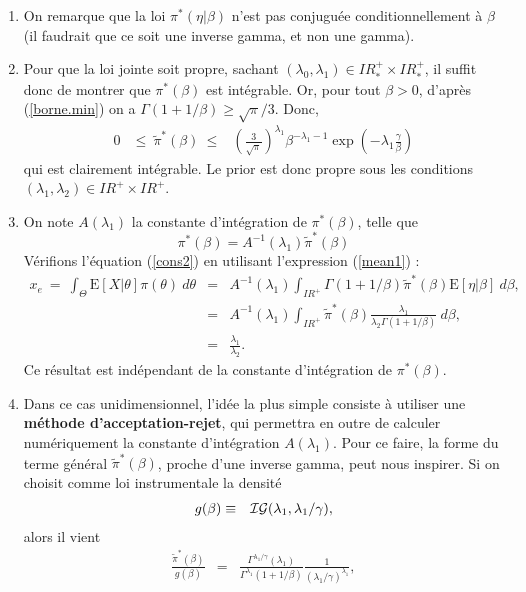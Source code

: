 \documentclass[10pt]{article}
\newcommand{\R}{I\!\!R}
\newcommand{\E}{\mbox{E}}
\newcommand{\1}{\mathbbm{1}}
\begin{document}
\begin{enumerate}
\item On remarque que la loi $\pi^*(\eta|\beta)$ n'est pas conjuguée conditionnellement à $\beta$ (il faudrait que ce soit une inverse gamma, et non une gamma). 
\item Pour que la loi jointe soit propre, sachant $(\lambda_0,\lambda_1)\in\R^+_*\times \R^+_*$, il suffit donc de montrer que $\pi^*(\beta)$ est intégrable. Or, pour tout $\beta>0$, d'après (\ref{borne.min}) on a $\Gamma(1+1/\beta)\geq \sqrt{\pi}/{3}$. Donc,  
\begin{eqnarray*}
0 & \leq \ \tilde{\pi}^*(\beta) \ \leq & \left(\frac{3}{\sqrt{\pi}}\right)^{\lambda_1} \beta^{-\lambda_1-1} \exp\left(-\lambda_1 \frac{\gamma}{\beta}\right)
\end{eqnarray*}
qui est clairement intégrable. Le prior est donc propre sous les conditions $(\lambda_1,\lambda_2)\in\R^+\times \R^+$. 
\item On note $A(\lambda_1)$ la constante d'intégration de $\pi^*(\beta)$, telle que
$$
\pi^*(\beta) = A^{-1}(\lambda_1)\tilde{\pi}^*(\beta)
$$
Vérifions l'équation (\ref{cons2}) en utilisant l'expression (\ref{mean1}) : 
\begin{eqnarray*}
x_e \ = \ \int_{\Theta} \E[X|\theta] \pi(\theta)  \ d\theta & = &  A^{-1}(\lambda_1) \int_{\R^+} \Gamma(1+1/\beta) \tilde{\pi}^*(\beta)\E[\eta|\beta] \ d\beta, \\
& = & A^{-1}(\lambda_1) \int_{\R^+}  \tilde{\pi}^*(\beta) \frac{\lambda_1}{\lambda_2 \Gamma(1+1/\beta)} \ d\beta, \\
& = & \frac{\lambda_1}{\lambda_2}.
\end{eqnarray*}
Ce résultat est indépendant de la constante d'intégration de $\pi^*(\beta)$.
\item Dans ce cas unidimensionnel, l'idée la plus simple consiste à utiliser une {\bf méthode d'acceptation-rejet}, qui permettra en outre de calculer numériquement la constante d'intégration  $A(\lambda_1)$. Pour ce faire, la forme du terme général $\tilde{\pi}^*(\beta)$, proche d'une inverse gamma, peut nous inspirer. Si on choisit comme loi instrumentale la densité
\begin{eqnarray*}
g(\beta) & \equiv & {\cal{IG}}(\lambda_1,\lambda_1/\gamma),
\end{eqnarray*}
alors il vient
\begin{eqnarray*}
\frac{\tilde{\pi}^*(\beta)}{g(\beta)} & = & \frac{\Gamma^{\lambda_1/\gamma}(\lambda_1)}{\Gamma^{\lambda_1}(1+1/\beta)}\frac{1}{\left(\lambda_1/\gamma\right)^{\lambda_1}}, \\

\end{eqnarray*}
\end{enumerate}
\end{document}
